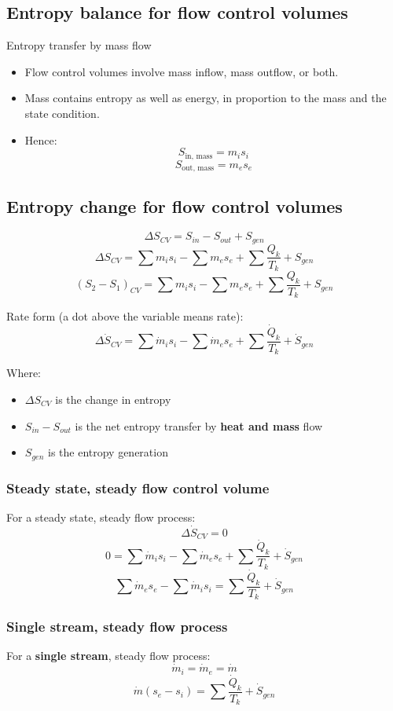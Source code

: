 \documentclass[11pt]{article}
\begin{document}
\subsection{Entropy balance for flow control volumes}
\label{sec:org17fe2f7}
Entropy transfer by mass flow
\begin{itemize}
\item Flow control volumes involve mass inflow, mass outflow, or both.
\item Mass contains entropy as well as energy, in proportion to the mass and the state condition.
\item Hence:
\[S_{\text{in, mass}} = m_i s_i\]
\[S_{\text{out, mass}} = m_e s_e\]
\end{itemize}
\subsection{Entropy change for flow control volumes}
\label{sec:orgea603f8}
\[\Delta S_{CV} = S_{in} - S_{out} + S_{gen}\]
\[\Delta S_{CV} = \sum m_i s_i - \sum m_e s_e + \sum \frac{Q_k}{T_k} + S_{gen}\]
\[(S_2 - S_1)_{CV} = \sum m_i s_i - \sum m_e s_e + \sum \frac{Q_k}{T_k} + S_{gen}\]

Rate form (a dot above the variable means rate):
\[\Delta \dot{S}_{CV} = \sum \dot{m}_i s_i - \sum \dot{m}_e s_e + \sum \frac{\dot{Q}_k}{T_k} + \dot{S}_{gen}\]

Where:
\begin{itemize}
\item \(\Delta S_{CV}\) is the change in entropy
\item \(S_{in} - S_{out}\) is the net entropy transfer by \textbf{heat and mass} flow
\item \(S_{gen}\) is the entropy generation
\end{itemize}
\subsubsection{Steady state, steady flow control volume}
\label{sec:orga4406a6}
For a steady state, steady flow process:
\[\Delta \dot{S}_{CV} = 0\]
\[0 = \sum \dot{m}_i s_i - \sum \dot{m}_e s_e + \sum \frac{\dot{Q}_k}{T_k} + \dot{S}_{gen}\]
\[\sum \dot{m}_e s_e - \sum \dot{m}_i s_i = \sum \frac{\dot{Q}_k}{T_k} + \dot{S}_{gen}\]
\subsubsection{Single stream, steady flow process}
\label{sec:org200085c}
For a \textbf{single stream}, steady flow process:
\[\dot{m}_i = \dot{m}_e = \dot{m}\]
\[\dot{m} (s_e - s_i) = \sum \frac{\dot{Q}_k}{T_k} + \dot{S}_{gen}\]
\end{document}
